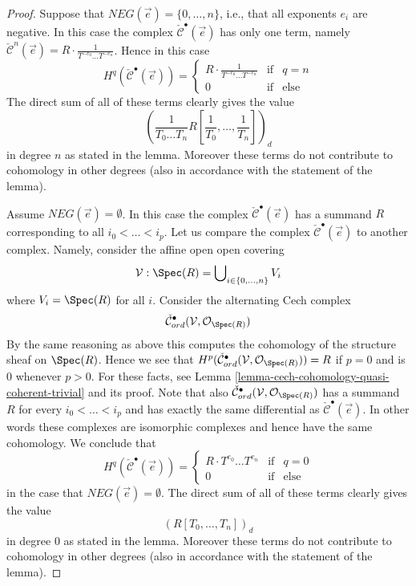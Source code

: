 \begin{proof}
\medskip\noindent
Suppose that $NEG(\vec{e}) = \{0, \ldots, n\}$, i.e., that all
exponents $e_i$ are negative.
In this case the complex $\check{\mathcal{C}}^\bullet(\vec{e})$ has
only one term, namely $\check{\mathcal{C}}^n(\vec{e}) =
R \cdot \frac{1}{T^{-e_0} \ldots T^{-e_n}}$. Hence in this
case
$$
H^q(\check{\mathcal{C}}^\bullet(\vec{e})) =
\left\{
\begin{matrix}
R \cdot \frac{1}{T^{-e_0} \ldots T^{-e_n}} & \text{if} & q = n \\
0 & \text{if} & \text{else}
\end{matrix}
\right.
$$
The direct sum of all of these terms clearly gives the value
$$
\left(\frac{1}{T_0 \ldots T_n} R[\frac{1}{T_0}, \ldots, \frac{1}{T_n}]\right)_d
$$
in degree $n$ as stated in the lemma. Moreover these terms do not contribute
to cohomology in other degrees (also in accordance with the statement of the
lemma).

\medskip\noindent
Assume $NEG(\vec{e}) = \emptyset$. In this case the complex
$\check{\mathcal{C}}^\bullet(\vec{e})$ has a summand $R$ corresponding
to all $i_0 < \ldots < i_p$.
Let us compare the complex $\check{\mathcal{C}}^\bullet(\vec{e})$
to another complex. Namely, consider the affine open open covering
$$
\mathcal{V} : \Spec(R) = \bigcup\nolimits_{i \in \{0, \ldots, n\}} V_i
$$
where $V_i = \Spec(R)$ for all $i$. Consider the alternating
Cech complex
$$
\check{\mathcal{C}}_{ord}^\bullet(\mathcal{V}, \mathcal{O}_{\Spec(R)})
$$
By the same reasoning as above this computes the cohomology of the
structure sheaf on $\Spec(R)$. Hence we see that
$H^p(
\check{\mathcal{C}}_{ord}^\bullet(\mathcal{V}, \mathcal{O}_{\Spec(R)})
) = R$ if $p = 0$ and is $0$ whenever $p > 0$.
For these facts, see
Lemma \ref{lemma-cech-cohomology-quasi-coherent-trivial} and its proof.
Note that also
$\check{\mathcal{C}}_{ord}^\bullet(\mathcal{V}, \mathcal{O}_{\Spec(R)})$
has a summand $R$ for every $i_0 < \ldots < i_p$ and has exactly the same
differential as $\check{\mathcal{C}}^\bullet(\vec{e})$. In other words
these complexes are isomorphic complexes and hence have the same cohomology.
We conclude that
$$
H^q(\check{\mathcal{C}}^\bullet(\vec{e})) =
\left\{
\begin{matrix}
R \cdot T^{e_0} \ldots T^{e_n} & \text{if} & q = 0 \\
0 & \text{if} & \text{else}
\end{matrix}
\right.
$$
in the case that $NEG(\vec{e}) = \emptyset$.
The direct sum of all of these terms clearly gives the value
$$
(R[T_0, \ldots, T_n])_d
$$
in degree $0$ as stated in the lemma. Moreover these terms do not contribute
to cohomology in other degrees (also in accordance with the statement of the
lemma).


\end{proof}
